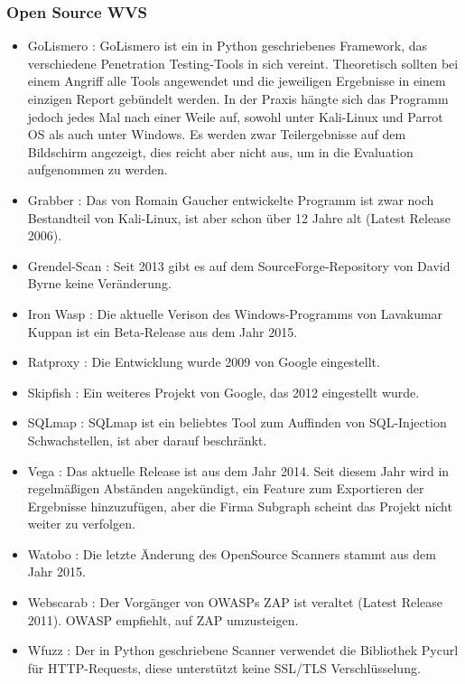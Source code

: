 \documentclass[12pt,oneside,a4paper,parskip,pointlessnumbers]{scrbook}
\begin{document}
    \subsubsection{Open Source WVS}
    \begin{itemize}
      \item GoLismero \cite{GoLismero}: GoLismero ist ein in Python geschriebenes Framework, das verschiedene Penetration Testing-Tools in sich vereint. Theoretisch sollten bei einem Angriff alle Tools angewendet und die jeweiligen Ergebnisse in einem einzigen Report gebündelt werden. In der Praxis hängte sich das Programm jedoch jedes Mal nach einer Weile auf, sowohl unter Kali-Linux und Parrot OS als auch unter Windows. Es werden zwar Teilergebnisse auf dem Bildschirm angezeigt, dies reicht aber nicht aus, um in die Evaluation aufgenommen zu werden.
      \item Grabber \cite{Grabber}: Das von Romain Gaucher entwickelte Programm ist zwar noch Bestandteil von Kali-Linux, ist aber schon über 12 Jahre alt (Latest Release 2006).
      \item Grendel-Scan \cite{Grendel}: Seit 2013 gibt es auf dem SourceForge-Repository von David Byrne keine Veränderung.
      \item Iron Wasp \cite{Iron}: Die aktuelle Verison des Windows-Programms von Lavakumar Kuppan ist ein Beta-Release aus dem Jahr 2015.
      \item Ratproxy \cite{Ratproxy}: Die Entwicklung wurde 2009 von Google eingestellt.
      \item Skipfish \cite{Skipfish}: Ein weiteres Projekt von Google, das 2012 eingestellt wurde.
      \item SQLmap \cite{SQLmap}: SQLmap ist ein beliebtes Tool zum Auffinden von SQL-Injection Schwachstellen, ist aber darauf beschränkt.
      \item Vega \cite{Vega}: Das aktuelle Release ist aus dem Jahr 2014. Seit diesem Jahr wird in regelmäßigen Abständen angekündigt, ein Feature zum Exportieren der Ergebnisse hinzuzufügen, aber die Firma Subgraph scheint das Projekt nicht weiter zu verfolgen.
      \item Watobo \cite{Watobo}: Die letzte Änderung des OpenSource Scanners stammt aus dem Jahr 2015.
      \item Webscarab \cite{Webscarab}: Der Vorgänger von OWASPs \ac{ZAP} ist veraltet (Latest Release 2011). OWASP empfiehlt, auf ZAP umzusteigen.
      \item Wfuzz \cite{Wfuzz}: Der in Python geschriebene Scanner verwendet die Bibliothek Pycurl für HTTP-Requests, diese unterstützt keine SSL/TLS Verschlüsselung.

\end{itemize}
\end{document}
